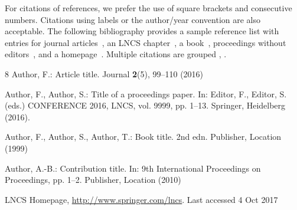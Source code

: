 \documentclass[runningheads]{llncs}
\begin{document}
For citations of references, we prefer the use of square brackets
and consecutive numbers. Citations using labels or the author/year
convention are also acceptable. The following bibliography provides
a sample reference list with entries for journal
articles~\cite{ref_article1}, an LNCS chapter~\cite{ref_lncs1}, a
book~\cite{ref_book1}, proceedings without editors~\cite{ref_proc1},
and a homepage~\cite{ref_url1}. Multiple citations are grouped
\cite{ref_article1,ref_lncs1,ref_book1},
\cite{ref_article1,ref_book1,ref_proc1,ref_url1}.
%
%
%
% 
% 
%
\begin{thebibliography}{8}
Author, F.: Article title. Journal \textbf{2}(5), 99--110 (2016)

Author, F., Author, S.: Title of a proceedings paper. In: Editor,
F., Editor, S. (eds.) CONFERENCE 2016, LNCS, vol. 9999, pp. 1--13.
Springer, Heidelberg (2016). 

Author, F., Author, S., Author, T.: Book title. 2nd edn. Publisher,
Location (1999)

Author, A.-B.: Contribution title. In: 9th International Proceedings
on Proceedings, pp. 1--2. Publisher, Location (2010)

LNCS Homepage, \url{http://www.springer.com/lncs}. Last accessed 4
Oct 2017
\end{thebibliography}
\end{document}
